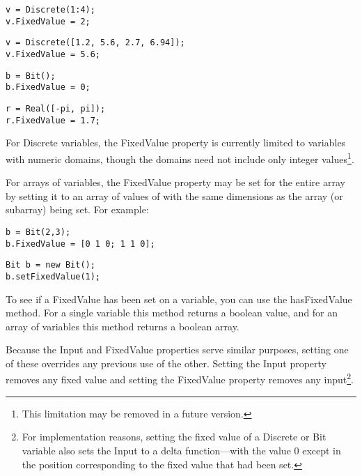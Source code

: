 \begin{lstlisting}
v = Discrete(1:4);
v.FixedValue = 2;
\end{lstlisting}

\begin{lstlisting}
v = Discrete([1.2, 5.6, 2.7, 6.94]);
v.FixedValue = 5.6;
\end{lstlisting}

\begin{lstlisting}
b = Bit();
b.FixedValue = 0;
\end{lstlisting}

\begin{lstlisting}
r = Real([-pi, pi]);
r.FixedValue = 1.7;
\end{lstlisting}

For Discrete variables, the FixedValue property is currently limited to variables with numeric domains, though the domains need not include only integer values\footnote{This limitation may be removed in a future version.}.


\ifmatlab

For arrays of variables, the FixedValue property may be set for the entire array by setting it to an array of values of with the same dimensions as the array (or subarray) being set.  For example:

\begin{lstlisting}
b = Bit(2,3);
b.FixedValue = [0 1 0; 1 1 0];
\end{lstlisting}

\fi

\ifjava
\begin{lstlisting}
Bit b = new Bit();
b.setFixedValue(1);
\end{lstlisting}
\fi

To see if a FixedValue has been set on a variable, you can use the hasFixedValue method.  \ifmatlab For a single variable this method returns a boolean value, and for an array of variables this method returns a boolean array. \fi

Because the Input and FixedValue properties serve similar purposes, setting one of these overrides any previous use of the other.  Setting the Input property removes any fixed value and setting the FixedValue property removes any input\footnote{For implementation reasons, setting the fixed value of a Discrete or Bit variable also sets the Input to a delta function---with the value 0 except in the position corresponding to the fixed value that had been set.}.



